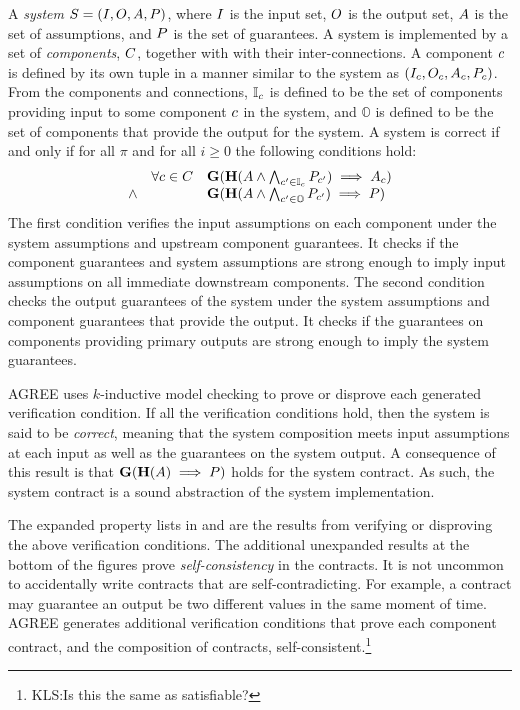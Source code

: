 A \emph{system} $S = (I, O, A,
P)$, where $I$ is the input set, $O$ is the
output set, $A$ is the set of assumptions, and $P$ is
the set of guarantees.  A system is implemented by a set of
\emph{components}, $C$, together with with their
inter-connections.  A component $c$ is defined by its own
tuple in a manner similar to the system as $(I_{c},
O_{c}, A_{c}, P_{c})$.
From the components and connections, $\mathbb{I}_{c}$ is
defined to be the set of components providing input to some component
$c$ in the system, and $\mathbb{O}$ is defined to be the set
of components that provide the output for the system.  A system is
correct if and only if for all $\pi$ and for all $i \ge 0$ the
following conditions hold:
\[
\begin{array}{lll}
        & \forall c \in C &
            \mathbf{G}(\mathbf{H}(A \wedge
            \bigwedge_{c^\prime \in \mathbb{I}_{c}} P_{c^\prime})
            \implies A_{c}) \\
 \wedge &   &
            \mathbf{G}(\mathbf{H}(A \wedge
            \bigwedge_{c^\prime \in \mathbb{O}} P_{c^\prime})
            \implies P)
\end{array}
\]
The first condition verifies the input assumptions on each component
under the system assumptions and upstream component guarantees.  It
checks if the component guarantees and system assumptions are strong
enough to imply input assumptions on all immediate downstream
components.  The second condition checks the output guarantees of the
system under the system assumptions and component guarantees that
provide the output.  It checks if the guarantees on components
providing primary outputs are strong enough to imply the system
guarantees.

AGREE uses $k$-inductive model checking to prove or disprove each generated verification condition.
If all the verification conditions hold, then the system is said to be \emph{correct}, meaning that the system composition meets input assumptions at each input as well as the guarantees on the system output. A consequence of this result is that $\mathbf{G}(\mathbf{H}(A) \implies P)$ holds for the system contract. As such, the system contract is a sound abstraction of the system implementation.

The expanded property lists in  and
 are the results from verifying or
disproving the above verification conditions.  The additional
unexpanded results at the bottom of the figures prove
\emph{self-consistency} in the contracts.  It is not uncommon to
accidentally write contracts that are self-contradicting.  For
example, a contract may guarantee an output be two different values in
the same moment of time.  AGREE generates additional verification
conditions that prove each component contract, and the composition of
contracts, self-consistent.\footnote{KLS:Is this the same as
satisfiable?}


